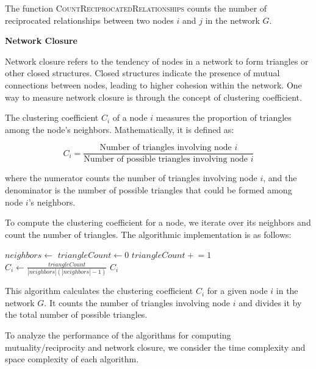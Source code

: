 \documentclass[12pt]{book} %
\begin{document}
The function \textsc{CountReciprocatedRelationships} counts the number of reciprocated relationships between two nodes \(i\) and \(j\) in the network \(G\).

\textbf{Network Closure}

Network closure refers to the tendency of nodes in a network to form triangles or other closed structures. Closed structures indicate the presence of mutual connections between nodes, leading to higher cohesion within the network. One way to measure network closure is through the concept of clustering coefficient.

The clustering coefficient \(C_i\) of a node \(i\) measures the proportion of triangles among the node's neighbors. Mathematically, it is defined as:

\[
C_i = \frac{\text{{Number of triangles involving node }} i}{\text{{Number of possible triangles involving node }} i}
\]

where the numerator counts the number of triangles involving node \(i\), and the denominator is the number of possible triangles that could be formed among node \(i\)'s neighbors.

To compute the clustering coefficient for a node, we iterate over its neighbors and count the number of triangles. The algorithmic implementation is as follows:
\FloatBarrier
\begin{algorithm}[H]
\caption{Clustering Coefficient Calculation}
\begin{algorithmic}[1]
    \State $neighbors \gets$ 
    \State $triangleCount \gets 0$
                \State $triangleCount \mathrel{+}= 1$
            \EndIf
        \EndFor
    \EndFor
    \State $C_i \gets \frac{triangleCount}{|neighbors|(|neighbors|-1)}$
    \State \Return $C_i$
\EndFunction
\end{algorithmic}
\end{algorithm}
\FloatBarrier

This algorithm calculates the clustering coefficient \(C_i\) for a given node \(i\) in the network \(G\). It counts the number of triangles involving node \(i\) and divides it by the total number of possible triangles.

To analyze the performance of the algorithms for computing mutuality/reciprocity and network closure, we consider the time complexity and space complexity of each algorithm.
\end{document}

